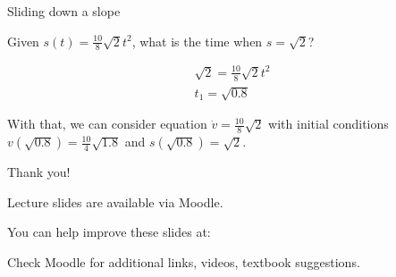 \documentclass{beamer}
\begin{document}
\begin{frame}{Sliding down a slope}
	\begin{flushleft}
		
		Given $s(t) =  \frac{10}{8} \sqrt{2} t ^2 $, what is the time when $s = \sqrt{2}$?
		
\begin{align}
	 \sqrt{2} =  \frac{10}{8} \sqrt{2} t ^2 \\
	 t_1 = \sqrt{0.8} 
\end{align}			

With that, we can consider equation $\dot v = \frac{10}{8} \sqrt{2}$ with initial conditions $v(\sqrt{0.8}) =  \frac{10}{4} \sqrt{1.8}$ and $s(\sqrt{0.8}) = \sqrt{2}$.
		
	\end{flushleft}
\end{frame}


\begin{frame}{Thank you!}
\centerline{Lecture slides are available via Moodle.}
\bigskip
\centerline{You can help improve these slides at:}
\centerline{\mygit}
\bigskip
\centerline{Check Moodle for additional links, videos, textbook suggestions.}
\bigskip

\centerline{\textcolor{black}{}}

\end{frame}
\end{document}
